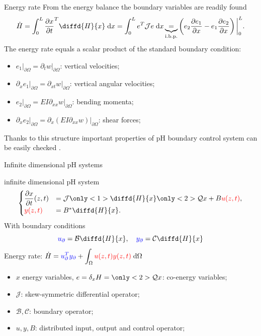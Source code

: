 \documentclass[aspectratio=169]{ISAE-Beamer}
\begin{document}
\begin{frame}{Energy rate}
From the energy balance the boundary variables are readily found
\begin{equation*}
	\dot{H} = \int_{0}^L \diffp{x}{t}^T \diffd{H}{x} \d{x} = \int_{0}^L e^T \mathcal{J} e \d{x} \underbrace{=}_{\text{i.b.p.}} \left(e_2 \diffp{e_1}{x} - e_1 \diffp{e_2}{x}\right)\bigg\rvert_0^L.
\end{equation*}
The energy rate equals a scalar product of the standard boundary condition:
\begin{itemize}
\item $e_1\vert_{\partial\Omega} = \partial_t w\vert_{\partial\Omega}$: vertical velocities;
\item $\partial_{x} e_1\vert_{\partial\Omega} = \partial_{xt} w\vert_{\partial\Omega}$: vertical angular velocities;
\item $e_2\vert_{\partial\Omega} = EI \partial_{xx} w\vert_{\partial\Omega}$: bending momenta;
\item $\partial_{x} e_2\vert_{\partial\Omega} =\partial_x(EI \partial_{xx}w)\vert_{\partial\Omega}$: shear forces;
\end{itemize}
Thanks to this structure important properties of pH boundary control system can be easily checked .
\end{frame}

\begin{frame}{Infinite dimensional pH systems}
\begin{block}{ infinite dimensional pH system}
\begin{equation*}
\begin{cases}
\displaystyle \diffp{x}{t}(z, t) &= \mathcal{J} \only<1>{\diffd{H}{x}} \only<2>{\mathcal{Q} x} + B \textcolor{red}{u(z, t)}, \\
\displaystyle \textcolor{red}{y(z, t)} &= B^* \diffd{H}{x}.
\end{cases}
\end{equation*}
With boundary conditions
\[\textcolor{blue}{u_\partial} = \mathcal{B} \diffd{H}{x}, \quad \textcolor{blue}{y_\partial} = \mathcal{C} \diffd{H}{x} \]
Energy rate: $\dot{H} = \displaystyle \textcolor{blue}{u_\partial^T y_\partial} +  \int_{\Omega} \textcolor{red}{u(z, t) y(z, t)} \d{\Omega}$
\begin{itemize}
	\item $x$ energy variables, $e = \delta_x H = \only<2>{\mathcal{Q} x}$: co-energy variables;
	\item $\mathcal{J}$: skew-symmetric differential operator;
	\item $\mathcal{B}, \mathcal{C}$: boundary operator;
	\item $u, y, B$: distributed input, output and control operator;
\end{itemize}
\end{block}
\end{frame}
\end{document}
